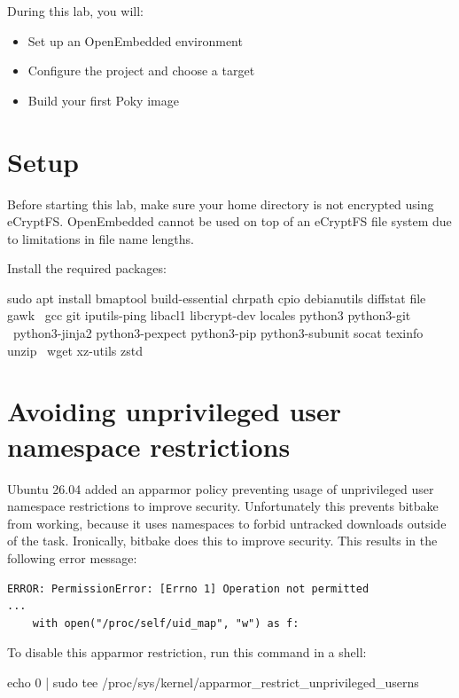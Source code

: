 
During this lab, you will:
\begin{itemize}
  \item Set up an OpenEmbedded environment
  \item Configure the project and choose a target
  \item Build your first Poky image
\end{itemize}

\section{Setup}

Before starting this lab, make sure your home directory is not
encrypted using eCryptFS. OpenEmbedded cannot be used on top of an eCryptFS file
system due to limitations in file name lengths.

Install the required packages:
\begin{bashinput}
sudo apt install bmaptool build-essential chrpath cpio debianutils diffstat file gawk \
	gcc git iputils-ping libacl1 libcrypt-dev locales python3 python3-git \
	python3-jinja2 python3-pexpect python3-pip python3-subunit socat texinfo unzip \
	wget xz-utils zstd
\end{bashinput}

\section{Avoiding unprivileged user namespace restrictions}

Ubuntu 26.04 added an apparmor policy preventing usage of unprivileged user
namespace restrictions to improve security. Unfortunately this prevents
bitbake from working, because it uses namespaces to forbid untracked
downloads outside of the \code{do_fetch} task. Ironically, bitbake does
this to improve security. This results in the following error message:

\begin{verbatim}
ERROR: PermissionError: [Errno 1] Operation not permitted
...
    with open("/proc/self/uid_map", "w") as f:
\end{verbatim}

To disable this apparmor restriction, run this command in a shell:

\begin{bashinput}
echo 0 | sudo tee /proc/sys/kernel/apparmor_restrict_unprivileged_userns
\end{bashinput}

